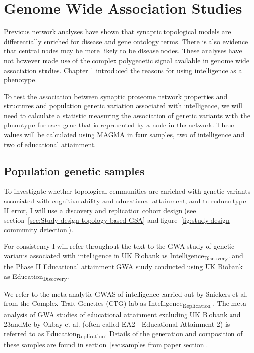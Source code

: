 \section{Genome Wide Association Studies}

Previous network analyses have shown that synaptic topological models are differentially enriched for disease and gene ontology terms. There is also evidence that central nodes may be more likely to be disease nodes. These analyses have not however made use of the complex polygenetic signal available in genome wide association studies. Chapter 1 introduced the reasons for using intelligence as a phenotype.

To test the association between synaptic proteome network properties and structures and population genetic variation associated with intelligence, we will need to calculate a statistic measuring the association of genetic variants with the phenotype for each gene that is represented by a node in the network. These values will be calculated using MAGMA in four samples, two of intelligence and two of educational attainment\cite{de2015magma}.


\subsection{Population genetic samples}
\label{sec:cohorts from paper section}
To investigate whether topological communities are enriched with genetic variants associated with cognitive ability and educational attainment, and to reduce type II  error, I will use a discovery and replication cohort design (see section~\ref{sec:Study design topology based GSA} and figure~\ref{fig:study design community detection}). 

For consistency I will refer throughout the text to the GWA study of genetic variants associated with intelligence in UK Biobank\cite{bycroft2018uk} as Intelligence\textsubscript{Discovery}. and the Phase II Educational attainment GWA study conducted using UK Biobank as Education\textsubscript{Discovery}.

We refer to the meta-analytic GWAS of intelligence carried out by Sniekers et al. from the Complex Trait Genetics (CTG) lab as Intelligence\textsubscript{Replication} \cite{sniekers2017genome}.   The meta-analysis of GWA studies of educational attainment excluding UK Biobank and 23andMe by Okbay et al.\cite{okbay2016genome} (often called EA2 - Educational Attainment 2) is referred to as Education\textsubscript{Replication}. Details of the generation and composition of these samples are found in section~\ref{sec:samples from paper section}. 

